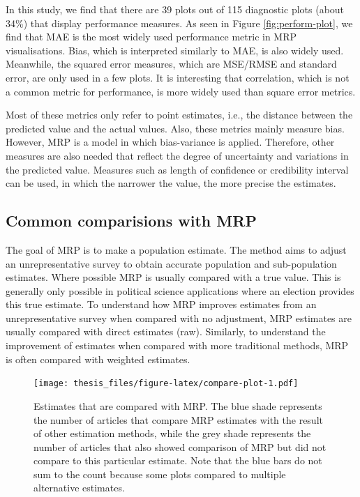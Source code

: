 \documentclass{monashthesis}
\begin{document}
In this study, we find that there are 39 plots out of 115 diagnostic plots (about 34\%) that display performance measures. As seen in Figure \ref{fig:perform-plot}, we find that MAE is the most widely used performance metric in MRP visualisations. Bias, which is interpreted similarly to MAE, is also widely used. Meanwhile, the squared error measures, which are MSE/RMSE and standard error, are only used in a few plots. It is interesting that correlation, which is not a common metric for performance, is more widely used than square error metrics.

Most of these metrics only refer to point estimates, i.e., the distance between the predicted value and the actual values. Also, these metrics mainly measure bias. However, MRP is a model in which bias-variance is applied. Therefore, other measures are also needed that reflect the degree of uncertainty and variations in the predicted value. Measures such as length of confidence or credibility interval can be used, in which the narrower the value, the more precise the estimates.

\hypertarget{common-comparisions-with-mrp}{%
\subsection{Common comparisions with MRP}\label{common-comparisions-with-mrp}}

The goal of MRP is to make a population estimate. The method aims to adjust an unrepresentative survey to obtain accurate population and sub-population estimates. Where possible MRP is usually compared with a true value. This is generally only possible in political science applications where an election provides this true estimate. To understand how MRP improves estimates from an unrepresentative survey when compared with no adjustment, MRP estimates are usually compared with direct estimates (raw). Similarly, to understand the improvement of estimates when compared with more traditional methods, MRP is often compared with weighted estimates.

\begin{figure}
\centering
\texttt{[image: thesis\_files/figure-latex/compare-plot-1.pdf]}
\caption{\label{fig:compare-plot}Estimates that are compared with MRP. The blue shade represents the number of articles that compare MRP estimates with the result of other estimation methods, while the grey shade represents the number of articles that also showed comparison of MRP but did not compare to this particular estimate. Note that the blue bars do not sum to the count because some plots compared to multiple alternative estimates.}
\end{figure}
\end{document}
